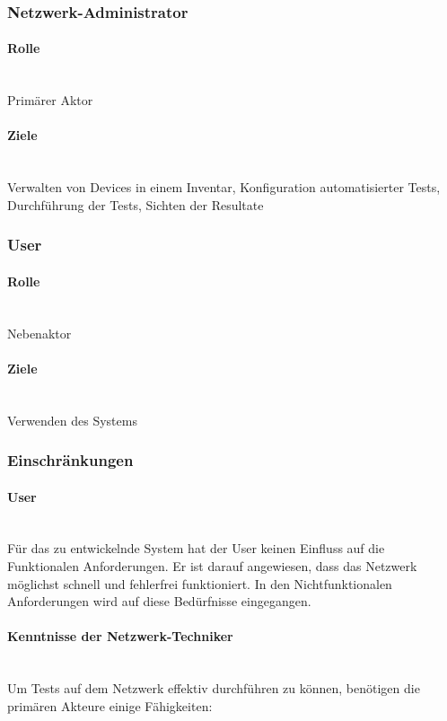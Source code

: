 \documentclass[
	ngerman,
	toc=listof, %
	toc=bibliography, %
	footnotes=multiple, %
	parskip=half, %
	numbers=noendperiod %
]{scrartcl}
\begin{document}
		\subsubsection{Netzwerk-Administrator}

			\paragraph{Rolle} ~\\
			Primärer Aktor 
			\paragraph{Ziele} ~\\
			Verwalten von Devices in einem Inventar, 
			Konfiguration automatisierter Tests, 
			Durchführung der Tests, 
			Sichten der Resultate

		\subsubsection{User}

			\paragraph{Rolle} ~\\
			Nebenaktor 
			\paragraph{Ziele} ~\\
			Verwenden des Systems

		\subsubsection{Einschränkungen}

			\paragraph{User} ~\\
			Für das zu entwickelnde System hat der User keinen Einfluss auf die Funktionalen Anforderungen. 
			Er ist darauf angewiesen, dass das Netzwerk möglichst schnell und fehlerfrei funktioniert. 
			In den Nichtfunktionalen Anforderungen wird auf diese Bedürfnisse eingegangen.

			\paragraph{Kenntnisse der Netzwerk-Techniker} ~\\
			Um Tests auf dem Netzwerk effektiv durchführen zu können, benötigen die primären Akteure einige Fähigkeiten:
\end{document}
